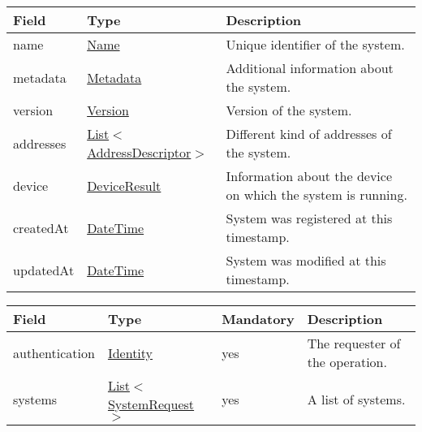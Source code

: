 \documentclass[a4paper]{arrowhead}
\newcommand{\pref}[1]{{\textcolor{ArrowheadGrey}{\hyperref[sec:model:primitives:#1]{#1}}}}
\begin{document}
 
\begin{table}[ht!]
\begin{tabularx}{\textwidth}{| p{2.5cm} | p{4cm} | X |} \hline
\rowcolor{gray!33} Field & Type      & Description \\ \hline
name & \pref{Name} & Unique identifier of the system. \\ \hline
metadata & \hyperref[sec:model:Metadata]{Metadata} & Additional information about the system. \\ \hline
version & \pref{Version} & Version of the system. \\ \hline
addresses &  \pref{List}$<$\hyperref[sec:model:AddressDescriptor]{AddressDescriptor}$>$ & Different kind of addresses of the system.  \\ \hline
device & \hyperref[sec:model:DeviceResult]{DeviceResult} & Information about the device on which the system is running. \\ \hline
createdAt & \pref{DateTime} & System was registered at this timestamp. \\ \hline
updatedAt & \pref{DateTime} & System was modified at this timestamp. \\ \hline
\end{tabularx}
\end{table}

\clearpage

 
\begin{table}[ht!]
\begin{tabularx}{\textwidth}{| p{2.5cm} | p{3.5cm} | p{2cm} | X |} \hline
\rowcolor{gray!33} Field & Type & Mandatory & Description \\ \hline
authentication & \hyperref[sec:model:Identity]{Identity} & yes & The requester of the operation. \\ \hline
systems & \pref{List}$<$\hyperref[sec:model:SystemRequest]{SystemRequest}$>$ & yes & A list of systems. \\ \hline
\end{tabularx}
\end{table}

 
\end{document}
